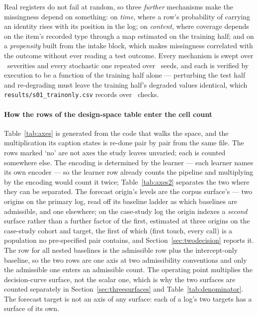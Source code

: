 Real registers do not fail at random, so three \emph{further} mechanisms make
the missingness depend on something: on \emph{time}, where a row's probability
of carrying an identity rises with its position in the log; on \emph{content},
where coverage depends on the item's recorded type through a map estimated on
the training half; and on a \emph{propensity} built from the intake block,
which makes missingness correlated with the outcome without ever reading a
test outcome. Every mechanism is swept over \nQualityLevels\ severities and
every stochastic one repeated over \nQualitySeeds\ seeds, and each is verified
by execution to be a function of the training half alone --- perturbing the
test half and re-degrading must leave the training half's degraded values
identical, which \texttt{results/s01\_trainonly.csv} records over \nTrainOnly\
checks.

\paragraph{How the rows of the design-space table enter the cell count}
Table~\ref{tab:axes} is generated from the code that walks the space, and
the multiplication its caption states is re-done pair by pair from the same
file. The rows marked `no' are not axes the study leaves unvaried; each is
counted somewhere else. The encoding is determined by the learner --- each
learner names its own encoder --- so the learner row already counts the
pipeline and multiplying by the encoding would count it twice;
Table~\ref{tab:axes2} separates the two where they can be separated. The
forecast origin's levels are the corpus surface's --- two origins on the
primary log, read off its baseline ladder as which baselines are admissible,
and one elsewhere; on the case-study log the origin indexes a \emph{second}
surface rather than a further factor of the first, estimated at three origins
on the case-study cohort and target, the first of which (first touch, every
call) is a population no pre-specified pair contains, and
Section~\ref{sec:twodecision} reports it. The row for all nested baselines is
the admissible row plus the intercept-only baseline, so the two rows are one
axis at two admissibility conventions and only the admissible one enters an
admissible count. The operating point multiplies the decision-curve surface,
not the scalar one, which is why the two surfaces are counted separately in
Section~\ref{sec:threesurfaces} and Table~\ref{tab:denominator}. The forecast target is not an axis of any
surface: each of a log's two targets has a surface of its own.

